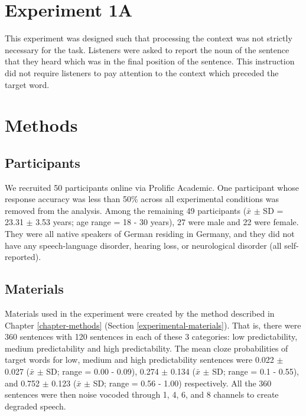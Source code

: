 \documentclass[a4paper, nobind]{templates/ociamthesis}
\begin{document}
\hypertarget{experiment1a}{%
\section{Experiment 1A}\label{experiment1a}}

This experiment was designed such that processing the context was not strictly necessary for the task.
Listeners were asked to report the noun of the sentence that they heard which was in the final position of the sentence.
This instruction did not require listeners to pay attention to the context which preceded the target word.

\hypertarget{methods}{%
\section{Methods}\label{methods}}

\hypertarget{participants}{%
\subsection{Participants}\label{participants}}

We recruited 50 participants online via Prolific Academic.
One participant whose response accuracy was less than 50\% across all experimental conditions was removed from the analysis.
Among the remaining 49 participants (\(\bar{x}\) \(\pm\) SD = 23.31 \(\pm\) 3.53 years; age range = 18 - 30 years), 27 were male and 22 were female.
They were all native speakers of German residing in Germany, and they did not have any speech-language disorder, hearing loss, or neurological disorder (all self-reported).

\hypertarget{materials}{%
\subsection{Materials}\label{materials}}

Materials used in the experiment were created by the method described in Chapter \ref{chapter-methods} (Section \ref{experimental-materials}).
That is, there were 360 sentences with 120 sentences in each of these 3 categories: low predictability, medium predictability and high predictability.
The mean cloze probabilities of target words for low, medium and high predictability sentences were 0.022 \(\pm\) 0.027 (\(\bar{x}\) \(\pm\) SD; range = 0.00 - 0.09), 0.274 \(\pm\) 0.134 (\(\bar{x}\) \(\pm\) SD; range = 0.1 - 0.55), and 0.752 \(\pm\) 0.123 (\(\bar{x}\) \(\pm\) SD; range = 0.56 - 1.00) respectively.
All the 360 sentences were then noise vocoded through 1, 4, 6, and 8 channels to create degraded speech.
\end{document}

